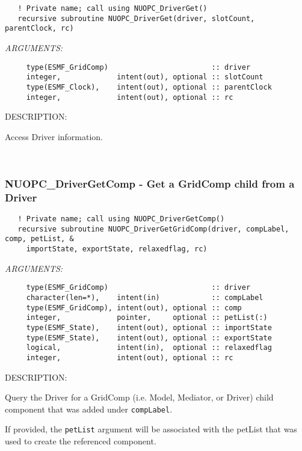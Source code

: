   
\begin{verbatim}   ! Private name; call using NUOPC_DriverGet()
   recursive subroutine NUOPC_DriverGet(driver, slotCount, parentClock, rc)\end{verbatim}{\em ARGUMENTS:}
\begin{verbatim}     type(ESMF_GridComp)                        :: driver
     integer,             intent(out), optional :: slotCount
     type(ESMF_Clock),    intent(out), optional :: parentClock
     integer,             intent(out), optional :: rc \end{verbatim}
{\sf DESCRIPTION:\\ }


     Access Driver information. 
 
\mbox{}\hrulefill\ 
 
\subsubsection [NUOPC\_DriverGetComp] {NUOPC\_DriverGetComp - Get a GridComp child from a Driver}


  
\begin{verbatim}   ! Private name; call using NUOPC_DriverGetComp()
   recursive subroutine NUOPC_DriverGetGridComp(driver, compLabel, comp, petList, &
     importState, exportState, relaxedflag, rc)\end{verbatim}{\em ARGUMENTS:}
\begin{verbatim}     type(ESMF_GridComp)                        :: driver
     character(len=*),    intent(in)            :: compLabel
     type(ESMF_GridComp), intent(out), optional :: comp
     integer,             pointer,     optional :: petList(:)
     type(ESMF_State),    intent(out), optional :: importState
     type(ESMF_State),    intent(out), optional :: exportState
     logical,             intent(in),  optional :: relaxedflag
     integer,             intent(out), optional :: rc \end{verbatim}
{\sf DESCRIPTION:\\ }


   Query the Driver for a GridComp (i.e. Model, Mediator, or Driver) child 
   component that was added under {\tt compLabel}.
  
   If provided, the {\tt petList} argument will be associated with the petList
   that was used to create the referenced component.
  
